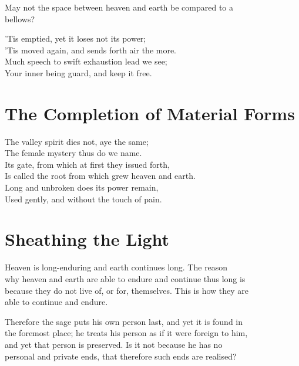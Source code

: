     May not the space between heaven and earth be compared to a\\
    bellows?\vspace{\baselineskip}
    
    'Tis emptied, yet it loses not its power;\\
    'Tis moved again, and sends forth air the more.\\
    Much speech to swift exhaustion lead we see;\\
    Your inner being guard, and keep it free.\vspace{\baselineskip}
    
\section*{The Completion of Material Forms}
    The valley spirit dies not, aye the same;\\
    The female mystery thus do we name.\\
    Its gate, from which at first they issued forth,\\
    Is called the root from which grew heaven and earth.\\
    Long and unbroken does its power remain,\\
    Used gently, and without the touch of pain.\vspace{\baselineskip}
    
\section*{Sheathing the Light}
    Heaven is long-enduring and earth continues long. The reason\\
    why heaven and earth are able to endure and continue thus long is\\
    because they do not live of, or for, themselves. This is how they are\\
    able to continue and endure.\vspace{\baselineskip}
    
    Therefore the sage puts his own person last, and yet it is found in\\
    the foremost place; he treats his person as if it were foreign to him,\\
    and yet that person is preserved. Is it not because he has no\\
    personal and private ends, that therefore such ends are realised?\vspace{\baselineskip}
    \newpage
    
